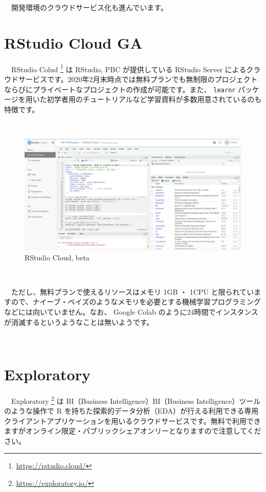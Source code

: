 \documentclass[
  12pt,
]{book}
\DeclareRobustCommand{\href}[2]{#2\footnote{\url{#1}}}
\begin{document}
　開発環境のクラウドサービス化も進んでいます。

\hypertarget{rstudio-cloud-ga}{%
\section{RStudio Cloud GA}\label{rstudio-cloud-ga}}

　\href{https://rstudio.cloud/}{RStudio Colud } は RStudio, PBC が提供している RStudio Server によるクラウドサービスです。2020年2月末時点では無料プランでも無制限のプロジェクトならびにプライベートなプロジェクトの作成が可能です。また、 \texttt{learnr} パッケージを用いた初学者用のチュートリアルなど学習資料が多数用意されているのも特徴です。

　\\

\begin{figure}[H]

{\centering \includegraphics[width=0.8\linewidth,]{fig/RStudio/Cloud} 

}

\caption{RStudio Cloud, beta}\label{fig:unnamed-chunk-158}
\end{figure}

　

　ただし、無料プランで使えるリソースはメモリ 1GB ・ 1CPU と限られていますので、ナイーブ・ベイズのようなメモリを必要とする機械学習プログラミングなどには向いていません。なお、 Google Colab のように24時間でインスタンスが消滅するというようなことは無いようです。

　

\hypertarget{exploratory}{%
\section{Exploratory}\label{exploratory}}

　\href{https://exploratory.io/}{Exploratory } は BI（Business Intelligence）BI（Business Intelligence）ツールのような操作で R を持ちた探索的データ分析（EDA）が行える利用できる専用クライアントアプリケーションを用いるクラウドサービスです。無料で利用できますがオンライン限定・パブリックシェアオンリーとなりますので注意してください。
\end{document}
